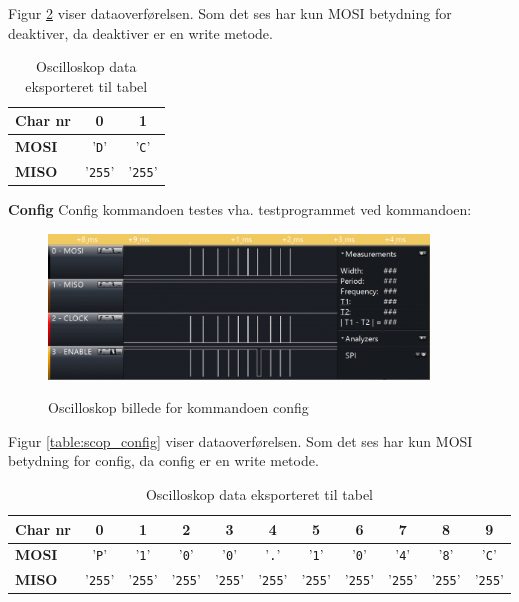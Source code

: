 Figur \ref{table:scop_deactivate} viser dataoverførelsen. Som det ses har kun MOSI betydning for deaktiver, da deaktiver er en write metode. 

\begin{table}[h]
	\caption{Oscilloskop data eksporteret til tabel}
	\centering
	\begin{tabular}{|l|c|c|}
		\hline 
		\textbf{Char nr} & \textbf{0} & \textbf{1} \\ 		
		\hline 
		\textbf{MOSI} & '\verb+D+' & '\verb+C+' \\ 
		\hline 
		\textbf{MISO} & '\verb+255+' & '\verb+255+' \\ 
		\hline 
	\end{tabular} 
	\label{table:scop_deactivate}
\end{table}


\textbf{Config}
Config kommandoen testes vha. testprogrammet ved kommandoen: 


\begin{figure}[h]
\centering
{\includegraphics[width=0.90\textwidth]{filer/modultest/Billeder/config}}
\caption{Oscilloskop billede for kommandoen config}
\label{lab:scop_config}
\end{figure}

Figur \ref{table:scop_config} viser dataoverførelsen. Som det ses har kun MOSI betydning for config, da config er en write metode. 

\begin{table}[h]
	\caption{Oscilloskop data eksporteret til tabel}
	\centering
	\begin{tabular}{|l|c|c|c|c|c|c|c|c|c|c|}
		\hline 
		\textbf{Char nr} & \textbf{0} & \textbf{1} & \textbf{2} & \textbf{3} & \textbf{4} & \textbf{5} 
						 & \textbf{6} & \textbf{7} & \textbf{8} & \textbf{9}\\ 		
		\hline 
		\textbf{MOSI} & '\verb+P+' & '\verb+1+' & '\verb+0+' & '\verb+0+' & '\verb+.+' & '\verb+1+' 
						& '\verb+0+' & '\verb+4+' & '\verb+8+' & '\verb+C+' \\ 
		\hline 
		\textbf{MISO} & '\verb+255+' & '\verb+255+' & '\verb+255+' & '\verb+255+' & '\verb+255+' & '\verb+255+' 
						& '\verb+255+' & '\verb+255+' & '\verb+255+' & '\verb+255+' \\ 
		\hline 
	\end{tabular} 
	\label{table:scop_deactivate}
\end{table}


